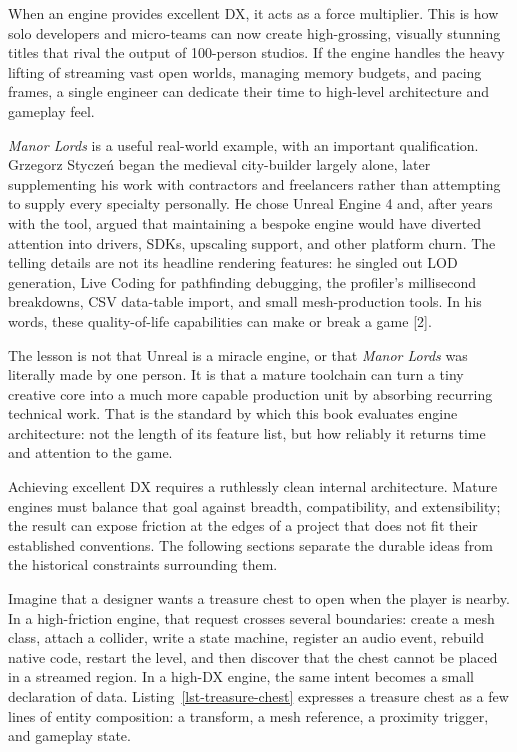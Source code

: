 \documentclass[
  11pt,
  letterpaper,
  DIV=11,
  numbers=noendperiod,
  twoside,
  open=right]{scrreprt}
\begin{document}
When an engine provides excellent DX, it acts as a force multiplier.
This is how solo developers and micro-teams can now create
high-grossing, visually stunning titles that rival the output of
100-person studios. If the engine handles the heavy lifting of streaming
vast open worlds, managing memory budgets, and pacing frames, a single
engineer can dedicate their time to high-level architecture and gameplay
feel.

\emph{Manor Lords} is a useful real-world example, with an important
qualification. Grzegorz Styczeń began the medieval city-builder largely
alone, later supplementing his work with contractors and freelancers
rather than attempting to supply every specialty personally. He chose
Unreal Engine 4 and, after years with the tool, argued that maintaining
a bespoke engine would have diverted attention into drivers, SDKs,
upscaling support, and other platform churn. The telling details are not
its headline rendering features: he singled out LOD generation, Live
Coding for pathfinding debugging, the profiler's millisecond breakdowns,
CSV data-table import, and small mesh-production tools. In his words,
these quality-of-life capabilities can make or break a game {[}2{]}.

The lesson is not that Unreal is a miracle engine, or that \emph{Manor
Lords} was literally made by one person. It is that a mature toolchain
can turn a tiny creative core into a much more capable production unit
by absorbing recurring technical work. That is the standard by which
this book evaluates engine architecture: not the length of its feature
list, but how reliably it returns time and attention to the game.

Achieving excellent DX requires a ruthlessly clean internal
architecture. Mature engines must balance that goal against breadth,
compatibility, and extensibility; the result can expose friction at the
edges of a project that does not fit their established conventions. The
following sections separate the durable ideas from the historical
constraints surrounding them.

Imagine that a designer wants a treasure chest to open when the player
is nearby. In a high-friction engine, that request crosses several
boundaries: create a mesh class, attach a collider, write a state
machine, register an audio event, rebuild native code, restart the
level, and then discover that the chest cannot be placed in a streamed
region. In a high-DX engine, the same intent becomes a small declaration
of data. Listing~\ref{lst-treasure-chest} expresses a treasure chest as
a few lines of entity composition: a transform, a mesh reference, a
proximity trigger, and gameplay state.
\end{document}
